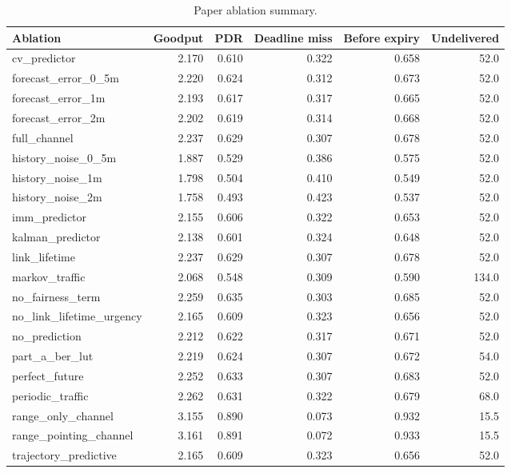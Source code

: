 \begin{table}[t]
\centering
\caption{Paper ablation summary.}
\begin{tabular}{lrrrrr}
\toprule
Ablation & Goodput & PDR & Deadline miss & Before expiry & Undelivered \\
\midrule
cv\_predictor & 2.170 & 0.610 & 0.322 & 0.658 & 52.0 \\
forecast\_error\_0\_5m & 2.220 & 0.624 & 0.312 & 0.673 & 52.0 \\
forecast\_error\_1m & 2.193 & 0.617 & 0.317 & 0.665 & 52.0 \\
forecast\_error\_2m & 2.202 & 0.619 & 0.314 & 0.668 & 52.0 \\
full\_channel & 2.237 & 0.629 & 0.307 & 0.678 & 52.0 \\
history\_noise\_0\_5m & 1.887 & 0.529 & 0.386 & 0.575 & 52.0 \\
history\_noise\_1m & 1.798 & 0.504 & 0.410 & 0.549 & 52.0 \\
history\_noise\_2m & 1.758 & 0.493 & 0.423 & 0.537 & 52.0 \\
imm\_predictor & 2.155 & 0.606 & 0.322 & 0.653 & 52.0 \\
kalman\_predictor & 2.138 & 0.601 & 0.324 & 0.648 & 52.0 \\
link\_lifetime & 2.237 & 0.629 & 0.307 & 0.678 & 52.0 \\
markov\_traffic & 2.068 & 0.548 & 0.309 & 0.590 & 134.0 \\
no\_fairness\_term & 2.259 & 0.635 & 0.303 & 0.685 & 52.0 \\
no\_link\_lifetime\_urgency & 2.165 & 0.609 & 0.323 & 0.656 & 52.0 \\
no\_prediction & 2.212 & 0.622 & 0.317 & 0.671 & 52.0 \\
part\_a\_ber\_lut & 2.219 & 0.624 & 0.307 & 0.672 & 54.0 \\
perfect\_future & 2.252 & 0.633 & 0.307 & 0.683 & 52.0 \\
periodic\_traffic & 2.262 & 0.631 & 0.322 & 0.679 & 68.0 \\
range\_only\_channel & 3.155 & 0.890 & 0.073 & 0.932 & 15.5 \\
range\_pointing\_channel & 3.161 & 0.891 & 0.072 & 0.933 & 15.5 \\
trajectory\_predictive & 2.165 & 0.609 & 0.323 & 0.656 & 52.0 \\
\bottomrule
\end{tabular}
\end{table}
